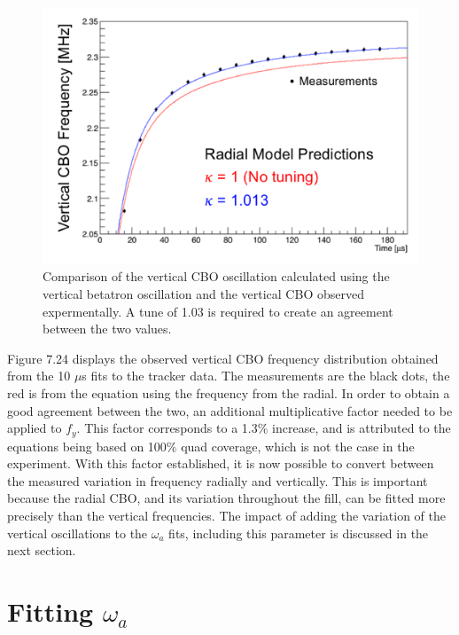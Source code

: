 \begin{figure}[!h]
\centering 
\includegraphics[scale=0.7]{Figures/VCBOvsFREQ.png}
\decoRule
\caption{Comparison of the vertical CBO oscillation calculated using the vertical betatron oscillation and the vertical CBO observed expermentally. A tune of 1.03 is required to create an agreement between the two values.}
\label{fig:VCBOvsFREQ}
\end{figure}

Figure 7.24 displays the observed vertical CBO frequency distribution obtained from the 10 $\mu$s fits to the tracker data. The measurements are the black dots, the red is from the equation using the frequency from the radial. In order to obtain a good agreement between the two, an additional multiplicative factor needed to be applied to $f_{y}$. This factor corresponds to a 1.3$\%$ increase, and is attributed to the equations being based on 100$\%$ quad coverage, which is not the case in the experiment. With this factor established, it is now possible to convert between the measured variation in frequency radially and vertically. This is important because the radial CBO, and its variation throughout the fill, can be fitted more precisely than the vertical frequencies. The impact of adding the variation of the vertical oscillations to the $\omega_{a}$ fits, including this parameter is discussed in the next section.  

\section{Fitting $\omega_{a}$}

